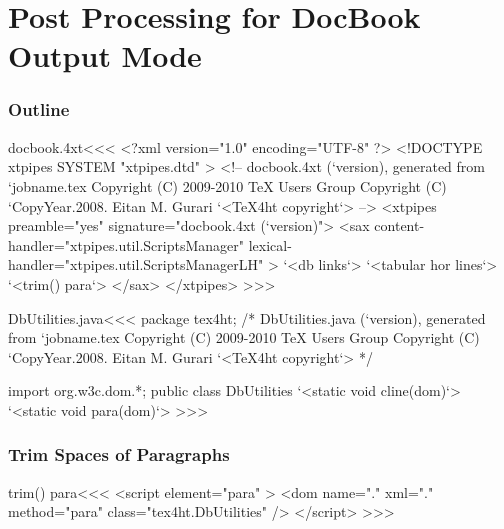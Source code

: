 \documentclass{article}
\begin{document}





\part{Post Processing for DocBook Output Mode}


\section{Outline}



\<docbook.4xt\><<<
<?xml version="1.0" encoding="UTF-8" ?>
<!DOCTYPE xtpipes SYSTEM "xtpipes.dtd" >
<!-- docbook.4xt (`version), generated from `jobname.tex
     Copyright (C) 2009-2010 TeX Users Group
     Copyright (C) `CopyYear.2008. Eitan M. Gurari
`<TeX4ht copyright`> -->
<xtpipes preamble="yes" signature="docbook.4xt (`version)">
   <sax content-handler="xtpipes.util.ScriptsManager" 
        lexical-handler="xtpipes.util.ScriptsManagerLH" >
     `<db links`>
     `<tabular hor lines`>
     `<trim() para`>
   </sax>
</xtpipes>
>>>




\<DbUtilities.java\><<<
package tex4ht;
/* DbUtilities.java (`version), generated from `jobname.tex
   Copyright (C) 2009-2010 TeX Users Group
   Copyright (C) `CopyYear.2008. Eitan M. Gurari
`<TeX4ht copyright`> */

import org.w3c.dom.*;
public class DbUtilities {
  `<static void cline(dom)`>
  `<static void para(dom)`>
}
>>>
 

\section{Trim Spaces of Paragraphs}

\<trim() para\><<<
<script element="para" >
   <dom name="." xml="." method="para" class="tex4ht.DbUtilities" />
</script> 
>>>
\end{document}
